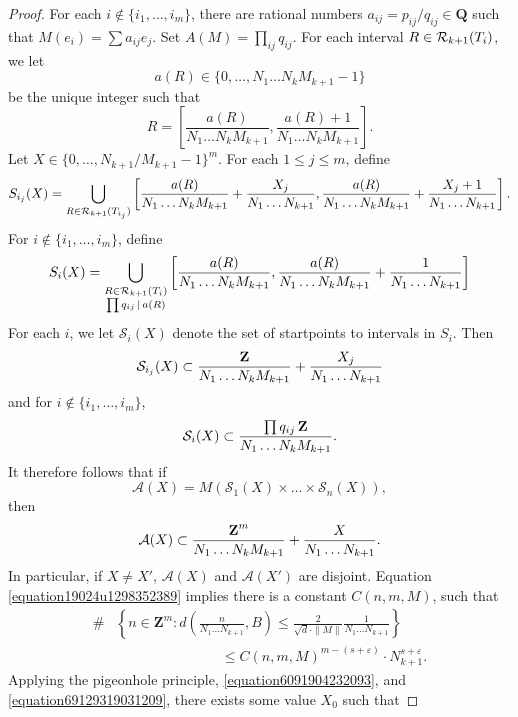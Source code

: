 \begin{proof}
    For each $i \not \in \{ i_1, \dots, i_m \}$, there are rational numbers $a_{ij} = p_{ij}/q_{ij} \in \mathbf{Q}$ such that $M(e_i) = \sum a_{ij} e_j$. Set $A(M) = \prod_{ij} q_{ij}$. For each interval $R \in \operatorname{\mathcal{R}}_{k+1}(T_i)$, we let
    \[ a(R) \in \{ 0, \dots, N_1 \dots N_k M_{k+1} - 1 \} \]
    be the unique integer such that
    \[ R = \left[ \frac{a(R)}{N_1 \dots N_k M_{k+1}}, \frac{a(R) + 1}{N_1 \dots N_k M_{k+1}} \right]. \]
    Let $X \in \{ 0, \dots, N_{k+1}/M_{k+1} - 1 \}^m$. For each $1 \leq j \leq m$, define
    \[ S_{i_j}(X) = \bigcup_{R \in \operatorname{\mathcal{R}}_{k+1}(T_{i_j})} \left[ \frac{a(R)}{N_1 \dots N_k M_{k+1}} + \frac{X_j}{N_1 \dots N_{k+1}}, \frac{a(R)}{N_1 \dots N_k M_{k+1}} + \frac{X_j + 1}{N_1 \dots N_{k+1}} \right]. \]
    For $i \not \in \{ i_1, \dots, i_m \}$, define
    \[ S_i(X) = \bigcup_{\substack{R \in \operatorname{\mathcal{R}}_{k+1}(T_i)\\ \prod q_{ij} \operatorname{\mid} a(R)}} \left[ \frac{a(R)}{N_1 \dots N_k M_{k+1}}, \frac{a(R)}{N_1 \dots N_k M_{k+1}} + \frac{1}{N_1 \dots N_{k+1}} \right] \]
    For each $i$, we let $\mathcal{S}_i(X)$ denote the set of startpoints to intervals in $S_i$. Then
    \[ \mathcal{S}_{i_j}(X) \subset \frac{\operatorname{\mathbf{Z}}}{N_1 \dots N_k M_{k+1}} + \frac{X_j}{N_1 \dots N_{k+1}} \]
    and for $i \not \in \{ i_1, \dots, i_m \}$,
    \[ \mathcal{S}_i(X) \subset \frac{\prod q_{ij} \operatorname{\mathbf{Z}}}{N_1 \dots N_k M_{k+1}}. \]
    It therefore follows that if
    \[ \mathcal{A}(X) = M(\mathcal{S}_1(X) \times \dots \times \mathcal{S}_n(X)), \]
    then
    \[ \mathcal{A}(X) \subset \frac{\operatorname{\mathbf{Z}}^m}{N_1 \dots N_k M_{k+1}} + \frac{X}{N_1 \dots N_{k+1}}. \]
    In particular, if $X \neq X'$, $\mathcal{A}(X)$ and $\mathcal{A}(X')$ are disjoint. Equation \eqref{equation19024u1298352389} implies there is a constant $C(n,m,M)$, such that
    \begin{equation} \label{equation69129319031209}
    \begin{split}
        \#& \left\{ n \in \mathbf{Z}^m : d \left( \frac{n}{N_1 \dots N_{k+1}}, B \right) \leq \frac{2}{\sqrt{d} \cdot \| M \|} \frac{1}{N_1 \dots N_{k+1}} \right\}\\
        &\ \ \ \ \ \ \ \ \ \ \ \ \ \ \ \ \ \ \ \ \ \ \ \ \ \ \ \ \ \ \ \ \ \ \leq C(n,m,M)^{m - (s + \varepsilon)} \cdot N_{k+1}^{s + \varepsilon}.
    \end{split}
    \end{equation}
    Applying the pigeonhole principle, \eqref{equation6091904232093}, and \eqref{equation69129319031209}, there exists some value $X_0$ such that

\end{proof}
